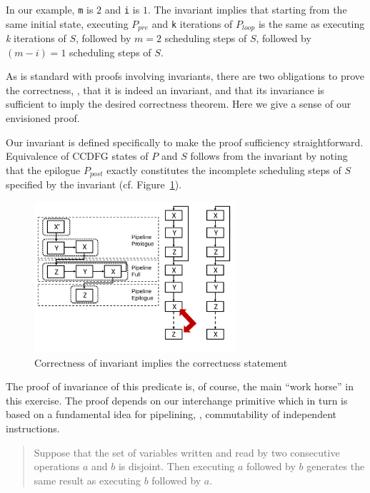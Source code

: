 In our example, {\tt m} is $2$
and {\tt i} is $1$.  The invariant implies that starting
from the same initial state, executing $P_{pre}$ and {\tt k}
iterations of $P_{loop}$ is the same as executing {\em k}
iterations of $S$, followed by $m = 2$ scheduling steps of
$S$, followed by $ (m - i) = 1$ scheduling steps of $S$.

As is standard with proofs involving invariants, there are
two obligations to prove the correctness, \viz, that it is indeed
an invariant, and that its invariance is sufficient to imply
the desired correctness theorem.  Here we give a sense of
our envisioned proof.

Our invariant is defined specifically to make the proof
sufficiency straightforward.
Equivalence of CCDFG states of $P$ and $S$ follows from the
invariant by noting that the epilogue $P_{post}$ exactly
constitutes the incomplete scheduling steps of $S$ specified
by the invariant
(cf. Figure~\ref{fig:invariant-implies-correctness}).

\begin{figure}[t!]
\begin{center}
\includegraphics[height=2.2in]{fig-proposal/invariant-implies-correctness}
\end{center}
\caption{Correctness of invariant implies the correctness statement}
\label{fig:invariant-implies-correctness}
\end{figure}

The proof of invariance of this predicate is, of course, the
main ``work horse'' in this exercise.  The proof depends on
our interchange primitive which in turn is based on a fundamental idea for pipelining,
\viz, commutability of
independent instructions.

\begin{quote}
Suppose that the
set of variables written and read by two consecutive
operations $a$ and $b$ is disjoint.  Then executing $a$
followed by $b$ generates the same result as executing $b$
followed by $a$.
\end{quote}

